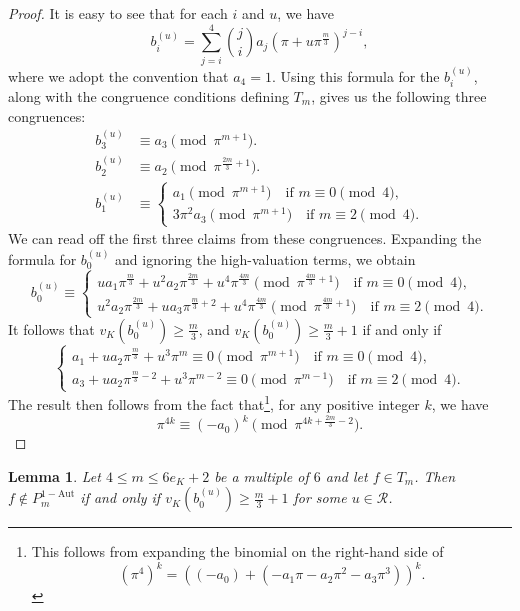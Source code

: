 \documentclass[11pt]{amsart}
\theoremstyle{theorem}
\newtheorem{lemma}[theorem]{Lemma}
\theoremstyle{example}
\theoremstyle{definition}
\numberwithin{theorem}{section}
\numberwithin{theorem}{section}
\newcommand{\oneaut}{\mathrm{1-Aut}}
\begin{document}
\begin{proof}
    It is easy to see that for each $i$ and $u$, we have 
    $$
    b_i^{(u)} = \sum_{j=i}^{4}\binom{j}{i}a_j(\pi + u\pi^{\frac{m}{3}})^{j-i},
    $$
    where we adopt the convention that $a_4 = 1$. Using this formula for the $b_i^{(u)}$, along with the congruence conditions defining $T_m$, gives us the following three congruences:
    \begin{align*} 
    b_3^{(u)}&\equiv a_3 \pmod{\pi^{m + 1}}.
    \\
    b_2^{(u)} &\equiv a_2\pmod{\pi^{\frac{2m}{3} + 1}}.
     \\
    b_1^{(u)} &\equiv \begin{cases} a_1\pmod{\pi^{m+1}}\quad\text{if $m\equiv 0\pmod{4}$},
        \\
        3\pi^2a_3\pmod{\pi^{m + 1}}\quad\text{if $m\equiv 2\pmod{4}$}.  
    \end{cases}  
\end{align*}
    We can read off the first three claims from these congruences. Expanding the formula for $b_0^{(u)}$ and ignoring the high-valuation terms, we obtain 
    $$
    b_0^{(u)} \equiv \begin{cases}
        ua_1  \pi^{\frac{m}{3}} + u^2a_2  \pi^{\frac{2m}{3}} + u^4 \pi^{\frac{4m}{3}} \pmod{\pi^{\frac{4m}{3}+1}} \quad\text{if $m\equiv 0\pmod{4}$},
        \\
        u^2 a_2\pi^{\frac{2m}{3}} + ua_3 \pi^{\frac{m}{3} + 2} + u^4\pi^{\frac{4m}{3}} \pmod{\pi^{\frac{4m}{3} + 1}}\quad\text{if $m\equiv 2\pmod{4}$}.
    \end{cases}
    $$
    It follows that $v_K(b_0^{(u)}) \geq \frac{m}{3}$, and $v_K(b_0^{(u)}) \geq \frac{m}{3}+1$ if and only if 
    $$
    \begin{cases}
        a_1 + ua_2\pi^{\frac{m}{3}} + u^3\pi^m \equiv 0\pmod{\pi^{m+1}}\quad\text{if $m\equiv 0\pmod{4}$},
        \\
        a_3 + ua_2\pi^{\frac{m}{3} - 2} + u^3\pi^{m-2} \equiv 0\pmod{\pi^{m-1}}\quad\text{if $m\equiv 2\pmod{4}$}.
    \end{cases}
    $$
    The result then follows from the fact that\footnote{This follows from expanding the binomial on the right-hand side of $$
    (\pi^4)^k = ((-a_0) + (-a_1\pi - a_2\pi^2 - a_3\pi^3))^k.
    $$
    }, for any positive integer $k$, we have 
    $$
    \pi^{4k} \equiv (-a_0)^k\pmod{\pi^{4k+\frac{2m}{3} - 2}}.
    $$
\end{proof}
\begin{lemma}
    \label{lem-T-m-iff-b0u-val}
    Let $4 \leq m \leq 6e_K + 2$ be a multiple of $6$ and let $f \in T_m$. Then $f \not \in P_m^{\oneaut}$ if and only if $v_K(b_0^{(u)}) \geq \frac{m}{3} + 1$ for some $u \in \mathcal{R}$. 
\end{lemma}
\end{document}
